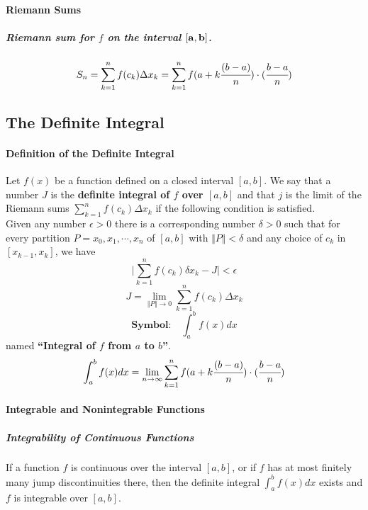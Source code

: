 \documentclass{article}
\begin{document}
            \paragraph{Riemann Sums}
                \subparagraph{Riemann sum for $f$ on the interval $\bf{[a,b]}$.}
                \[S_n=\sum_{k=1}^{n}f(c_k)\Delta x_k=\sum_{k=1}^{n}f(a+k\cfrac{(b-a)}{n})\cdot (\cfrac{b-a}{n})\]

        \subsection{The Definite Integral}
            \paragraph{Definition of the Definite Integral}
                Let $f(x)$ be a function defined on a closed interval $[a,b]$. We say that a number $J$ is the \textbf{definite integral of $f$ over $[a,b]$} and that $j$ is the limit of the Riemann sums $\sum_{k=1}^{n}f(c_k)\Delta x_k$ if the following condition is satisfied.\\
                Given any number $\epsilon > 0$ there is a corresponding number $\delta > 0$ such that for every partition $P={x_0,x_1,\cdots,x_n}$ of $[a,b]$ with $\Vert P \Vert < \delta$ and any choice of $c_k$ in $[x_{k-1},x_k]$, we have
                \[\lvert \sum_{k=1}^{n}f(c_k)\delta x_k -J\rvert<\epsilon\]
                \[J=\lim\limits_{\Vert P\Vert \to 0}\sum_{k=1}^{n}f(c_k)\Delta x_k\]
                \[\textbf{Symbol:}\quad\int_{a}^{b}f(x)dx\]
                named \textbf{``Integral of $f$ from $a$ to $b$''}.
                \[\int_{a}^{b}f(x)dx=\lim\limits_{n\to \infty}\sum_{k=1}^{n}f(a+k\cfrac{(b-a)}{n})\cdot (\cfrac{b-a}{n})\]
            \paragraph{Integrable and Nonintegrable Functions}
                \subparagraph{Integrability of Continuous Functions} If a function $f$ is continuous over the interval $[a,b]$, or if $f$ has at most finitely many jump discontinuities there, then the definite integral $\int_{a}^{b} f(x)dx$ exists and $f$ is integrable over $[a,b]$.
\end{document}

